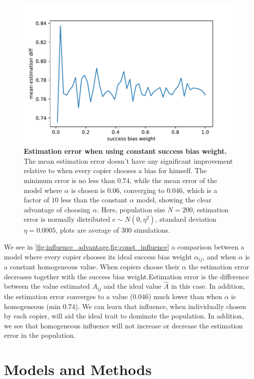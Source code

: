 \documentclass[12pt]{extarticle}
\begin{document}
\begin{figure}[h]
    \includegraphics[width=\linewidth]{../figures/influence_advantage/const_bias.pdf}
  \caption{
  \textbf{Estimation error when using constant success bias weight.}
  The mean estimation error doesn't have any significant improvement relative to when every copier chooses a bias for himself.
  The minimum error is no less than $0.74$, while the mean error of the model where $\alpha$ is chosen is $0.06$, converging to $0.046$, which is a factor of $10$ less than the constant $\alpha$ model, showing the clear advantage of choosing $\alpha$.
  Here, population size $N=200$, estimation error is normally distributed $e \sim N(0,\eta^2)$, standard deviation $\eta=0.0005$, plots are average of $300$ simulations.}	
  \label{fig:const_influence}
\end{figure}

We see in \cref{fig:influence_advantage,fig:const_influence} a comparison between a model where every copier chooses its ideal success bias weight $\alpha_{ij}$, and when $\alpha$ is a constant homogeneous value. When copiers choose their $\alpha$ the estimation error decreases together with the success bias weight.Estimation error is the difference between the value estimated $A_{ij}$ and the ideal value $\hat{A}$ in this case. In addition, the estimation error converges to a value ($0.046$) much lower than when $\alpha$ is homogeneous (min $0.74$).
We can learn that influence, when individually chosen by each copier, will aid the ideal trait to dominate the population. In addition, we see that homogeneous influence will not increase or decrease the estimation error in the population.
\section*{Models and Methods}
\end{document}
